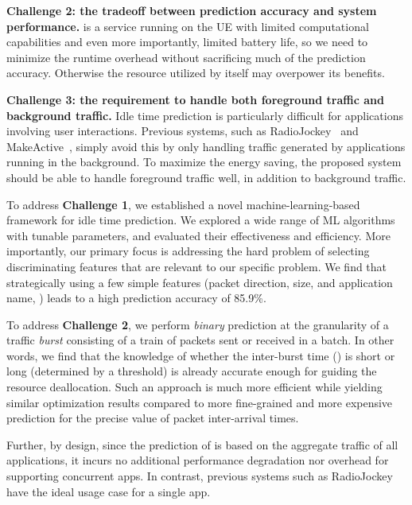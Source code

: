 \textbf{Challenge 2: the tradeoff between prediction accuracy and system performance.} \NAME is a service running on the UE with limited computational capabilities and even more importantly, limited battery life, so we need to minimize the runtime overhead without sacrificing much of the prediction accuracy. Otherwise the resource utilized by \NAME itself may overpower its benefits.

\textbf{Challenge 3: the requirement to handle both foreground traffic and background traffic.} Idle time prediction is particularly difficult for applications involving user interactions. Previous systems, such as RadioJockey~\cite{radiojockey} and MakeActive~\cite{makeidle}, simply avoid this by only handling traffic generated by applications running in the background. To maximize the energy saving, the proposed system should be able to handle foreground traffic well, in addition to background traffic.

To address {\bf Challenge 1}, we established a novel machine-learning-based framework for idle time prediction. 
We explored a wide range of ML algorithms with tunable parameters, and evaluated their effectiveness and efficiency. More importantly, our primary focus is addressing the hard problem of selecting discriminating features that are relevant to our specific problem. We find that strategically using a few simple features (\eg packet direction, size, and application name, \etc) leads to a high prediction accuracy of 85.9\%.


To address {\bf Challenge 2}, we perform \emph{binary} prediction at the granularity of a traffic \emph{burst} consisting of a train of packets sent or received in a batch. In other words, we find that the knowledge of whether the inter-burst time (\IBT) is short or long (determined by a threshold) is
already accurate enough for guiding the resource deallocation.
Such an approach is much more efficient while yielding similar optimization results compared to more fine-grained and more expensive prediction for the precise value of packet inter-arrival times.

Further, by design, since the prediction of \NAME is based on the aggregate traffic of all applications, it incurs no additional performance degradation nor overhead for supporting concurrent apps. In contrast, previous systems such as RadioJockey have the ideal usage case for a single app. 

